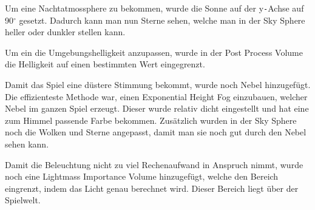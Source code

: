 Um eine Nachtatmossphere zu bekommen, wurde die Sonne auf der y\verb+-+Achse auf 90$^\circ$ gesetzt. Dadurch kann man nun Sterne sehen,
welche man in der Sky Sphere heller oder dunkler stellen kann.

Um ein die Umgebungshelligkeit anzupassen, wurde in der Post Process Volume die Helligkeit auf einen bestimmten Wert eingegrenzt.

Damit das Spiel eine düstere Stimmung bekommt, wurde noch Nebel hinzugefügt. Die effizienteste Methode war, einen Exponential Height Fog einzubauen, welcher
Nebel im ganzen Spiel erzeugt. Dieser wurde relativ dicht eingestellt und hat eine zum Himmel passende Farbe bekommen. Zusätzlich wurden in der Sky Sphere noch die Wolken
und Sterne angepasst, damit man sie noch gut durch den Nebel sehen kann.

Damit die Beleuchtung nicht zu viel Rechenaufwand in Anspruch nimmt, wurde noch eine Lightmass Importance Volume hinzugefügt, welche den Bereich eingrenzt,
indem das Licht genau berechnet wird. Dieser Bereich liegt über der Spielwelt.

